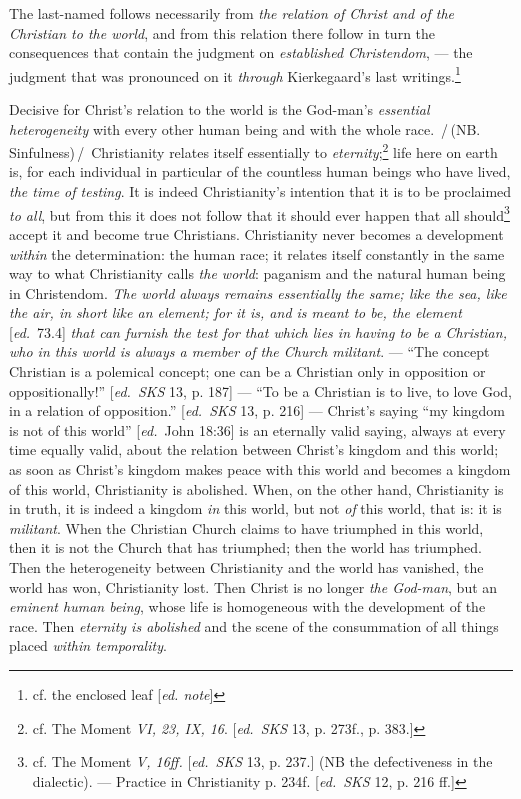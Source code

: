 \documentclass[12pt,a4paper,openany]{book}
\newcommand{\kpage}[1]{\marginnote{\footnotesize\textit{[#1]}}}
\newcommand{\ed}[1]{{\small[\textit{ed.}\ #1]}}
\newcommand{\ednote}[1]{{\small[\textit{ed. note}]}}
\newcommand{\ins}[1]{\,/\,#1\,/\,}
\begin{document}
The last-named follows necessarily from \emph{the relation of Christ and of the Christian to
the world}, and from this relation there follow in turn the consequences that contain
the judgment on \emph{established Christendom}, --- the judgment that was pronounced
on it \emph{through} Kierkegaard's last writings.\footnote[96]{cf. the enclosed leaf
\ednote{}}

Decisive for Christ's relation to the world is the God-man's
\emph{essential heterogeneity} with every other human being and with the whole
race. \ins{(NB. Sinfulness)} Christianity relates itself essentially
to \emph{eternity};\footnote[97]{cf. The Moment \emph{VI, 23, IX, 16}. \ed{\emph{SKS} 13, p. 273f., p. 383.}}
life here on earth is, for each individual in particular
of the countless human beings who have lived, \emph{the time of testing}. It is indeed
Christianity's intention that it is to be proclaimed \emph{to all}, but from this it does
not follow that it should ever happen that all should\footnote[98]{cf. The Moment \emph{V, 16ff.} \ed{\emph{SKS} 13, p. 237.} (NB the defectiveness in the dialectic). ---
Practice in Christianity p. 234f. \ed{\emph{SKS} 12, p. 216 ff.}}
accept
it and become true Christians. Christianity never becomes a
development \emph{within} the determination: the human race; it relates
itself constantly in the same way to what Christianity calls
\emph{the world}: paganism and the natural human being in Christendom.
\emph{The world always remains essentially the same; like the sea, like the air, in short like an
element; for it is, and is meant to be, the element} \ed{73.4} \emph{that can furnish the test for
that which lies in having to be a Christian, who in this world is always a member of the Church
militant}. --- ``The concept Christian is a polemical concept; one can
be a Christian only in opposition or oppositionally!'' \ed{\emph{SKS} 13, p.
187} --- ``To be a Christian is to live, to love God, in a relation of opposition.''
\ed{\emph{SKS} 13, p. 216} --- Christ's saying ``my kingdom is not
of this world'' \ed{John 18:36} is an eternally valid saying, always at every time
equally valid, about the relation between Christ's kingdom and this
world; as soon as Christ's kingdom makes peace with this world and
\kpage{156}becomes a kingdom of this world, Christianity is abolished. When,
on the other hand, Christianity is in truth, it is indeed a kingdom \emph{in} this
world, but not \emph{of} this world, that is: it is \emph{militant}. When the
Christian Church claims to have triumphed in this world, then it is not the Church that
has triumphed; then the world has triumphed. Then the heterogeneity between
Christianity and the world has vanished, the world has won, Christianity
lost. Then Christ is no longer \emph{the God-man}, but an \emph{eminent
human being}, whose life is homogeneous with the development of the race.
Then \emph{eternity is abolished} and the scene of the consummation of all things
placed \emph{within temporality}.
\end{document}
